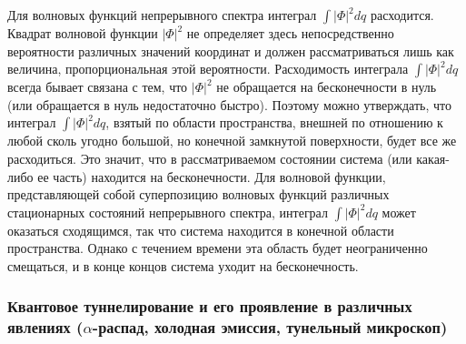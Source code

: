 Для волновых функций непрерывного спектра интеграл $\int | \Phi |^2 dq$ расходится.
Квадрат волновой функции $|\Phi|^2$ не определяет здесь непосредственно вероятности
различных значений координат и должен рассматриваться лишь как величина, пропорциональная
этой вероятности. Расходимость интеграла $\int | \Phi |^2 dq$ всегда бывает связана с тем,
что $|\Phi|^2$ не обращается на бесконечности в нуль (или обращается в нуль недостаточно
быстро). Поэтому можно утверждать, что интеграл $\int | \Phi |^2 dq$, взятый по
области пространства, внешней по отношению к любой сколь угодно большой, но конечной
замкнутой поверхности, будет все же расходиться. Это значит, что в рассматриваемом
состоянии система (или какая-либо ее часть) находится на бесконечности. Для волновой функции,
представляющей собой суперпозицию волновых функций различных стационарных состояний
непрерывного спектра, интеграл $\int |\Phi|^2 dq$ может оказаться сходящимся, так что
система находится в конечной области пространства. Однако с течением времени эта область
будет неограниченно смещаться, и в конце концов система уходит на бесконечность.


\subsubsection{Квантовое туннелирование и его проявление в различных явлениях ($\alpha$-распад, холодная эмиссия, тунельный микроскоп)}



